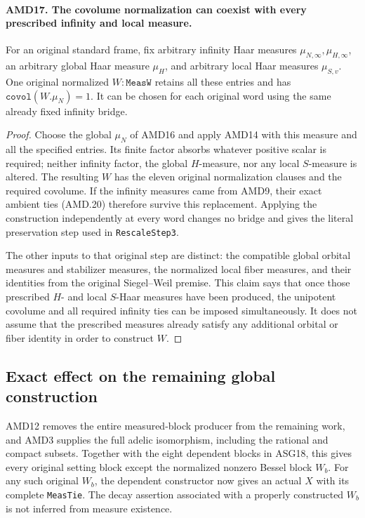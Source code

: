 \paragraph{AMD17. The covolume normalization can coexist with every prescribed infinity and local measure.}
\label{claim:AMD17}
For an original standard frame, fix arbitrary infinity Haar
measures \(\mu_{N,\infty},\mu_{H,\infty}\), an arbitrary
global Haar measure \(\mu_H\), and arbitrary local Haar
measures \(\mu_{S,v}\).  One original normalized
\(W:\texttt{MeasW}\) retains all these entries and has
\(\texttt{covol}(W.\mu_N)=1\).  It can be chosen for each
original word using the same already fixed infinity bridge.

\begin{proof}
Choose the global \(\mu_N\) of AMD16 and apply AMD14 with
this measure and all the specified entries.  Its finite factor
absorbs whatever positive scalar is required; neither infinity
factor, the global \(H\)-measure, nor any local \(S\)-measure
is altered.  The resulting \(W\) has the eleven original
normalization clauses and the required covolume.  If the
infinity measures came from AMD9, their exact ambient ties
(AMD.20) therefore survive this replacement.  Applying the
construction independently at every word changes no bridge
and gives the literal preservation step used in
\texttt{RescaleStep3}.

The other inputs to that original step are distinct: the
compatible global orbital measures and stabilizer measures,
the normalized local fiber measures, and their identities from
the original Siegel--Weil premise.  This claim says that once
those prescribed \(H\)- and local \(S\)-Haar measures have
been produced, the unipotent covolume and all required infinity
ties can be imposed simultaneously.  It does not assume that
the prescribed measures already satisfy any additional orbital
or fiber identity in order to construct \(W\).
\end{proof}

\subsection{Exact effect on the remaining global construction}

AMD12 removes the entire measured-block producer from the
remaining work, and AMD3 supplies the full adelic isomorphism,
including the rational and compact subsets.  Together with the
eight dependent blocks in ASG18, this gives every original
setting block except the normalized nonzero Bessel block
\(W_b\).  For any such original \(W_b\), the dependent
constructor now gives an actual \(X\) with its complete
\texttt{MeasTie}.  The decay assertion associated with a
properly constructed \(W_b\) is not inferred from measure
existence.

